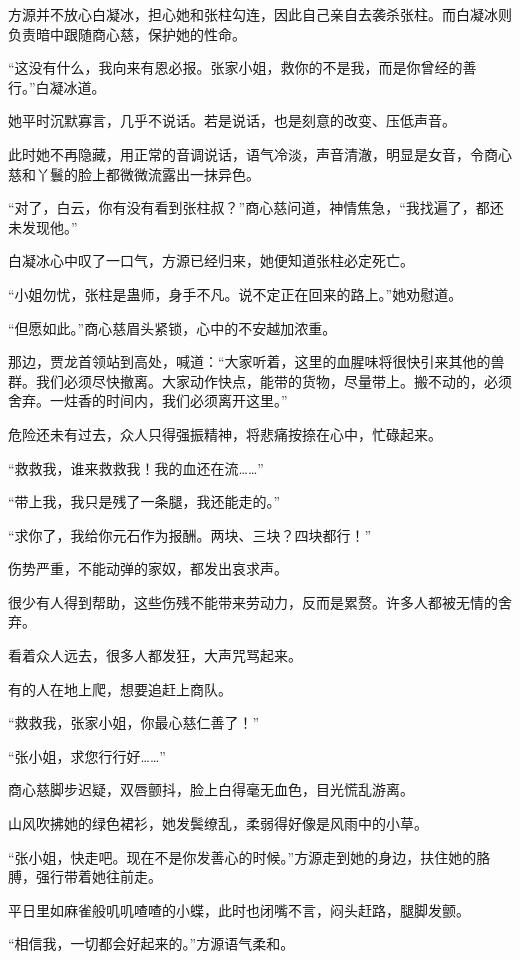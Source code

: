 \begin{this_body}
方源并不放心白凝冰，担心她和张柱勾连，因此自己亲自去袭杀张柱。而白凝冰则负责暗中跟随商心慈，保护她的性命。

“这没有什么，我向来有恩必报。张家小姐，救你的不是我，而是你曾经的善行。”白凝冰道。

她平时沉默寡言，几乎不说话。若是说话，也是刻意的改变、压低声音。

此时她不再隐藏，用正常的音调说话，语气冷淡，声音清澈，明显是女音，令商心慈和丫鬟的脸上都微微流露出一抹异色。

“对了，白云，你有没有看到张柱叔？”商心慈问道，神情焦急，“我找遍了，都还未发现他。”

白凝冰心中叹了一口气，方源已经归来，她便知道张柱必定死亡。

“小姐勿忧，张柱是蛊师，身手不凡。说不定正在回来的路上。”她劝慰道。

“但愿如此。”商心慈眉头紧锁，心中的不安越加浓重。

那边，贾龙首领站到高处，喊道：“大家听着，这里的血腥味将很快引来其他的兽群。我们必须尽快撤离。大家动作快点，能带的货物，尽量带上。搬不动的，必须舍弃。一炷香的时间内，我们必须离开这里。”

危险还未有过去，众人只得强振精神，将悲痛按捺在心中，忙碌起来。

“救救我，谁来救救我！我的血还在流……”

“带上我，我只是残了一条腿，我还能走的。”

“求你了，我给你元石作为报酬。两块、三块？四块都行！”

伤势严重，不能动弹的家奴，都发出哀求声。

很少有人得到帮助，这些伤残不能带来劳动力，反而是累赘。许多人都被无情的舍弃。

看着众人远去，很多人都发狂，大声咒骂起来。

有的人在地上爬，想要追赶上商队。

“救救我，张家小姐，你最心慈仁善了！”

“张小姐，求您行行好……”

商心慈脚步迟疑，双唇颤抖，脸上白得毫无血色，目光慌乱游离。

山风吹拂她的绿色裙衫，她发鬓缭乱，柔弱得好像是风雨中的小草。

“张小姐，快走吧。现在不是你发善心的时候。”方源走到她的身边，扶住她的胳膊，强行带着她往前走。

平日里如麻雀般叽叽喳喳的小蝶，此时也闭嘴不言，闷头赶路，腿脚发颤。

“相信我，一切都会好起来的。”方源语气柔和。


\end{this_body}

